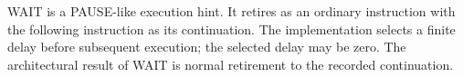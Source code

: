 WAIT is a PAUSE-like execution hint. It retires as an ordinary instruction with the following instruction as its
continuation. The implementation selects a finite delay before subsequent execution; the selected delay may be zero.
The architectural result of WAIT is normal retirement to the recorded continuation.
